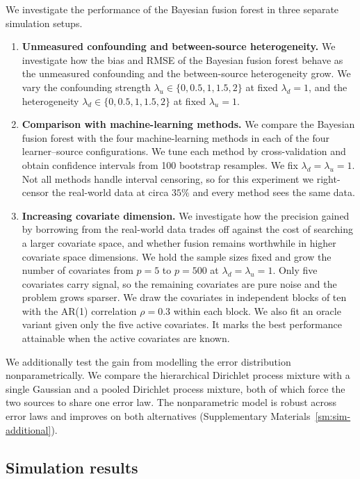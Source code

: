 We investigate the performance of the Bayesian fusion forest in three separate simulation setups.
\begin{enumerate}[label=\arabic*), leftmargin=*]
  \item \textbf{Unmeasured confounding and between-source heterogeneity.}
    We investigate how the bias and RMSE of the Bayesian fusion forest behave as the unmeasured confounding and the between-source heterogeneity grow.
    We vary the confounding strength $\lambda_u \in \{0, 0.5, 1, 1.5, 2\}$ at fixed $\lambda_d = 1$, and the heterogeneity $\lambda_d \in \{0, 0.5, 1, 1.5, 2\}$ at fixed $\lambda_u = 1$.
  \item \textbf{Comparison with machine-learning methods.}
    We compare the Bayesian fusion forest with the four machine-learning methods in each of the four learner--source configurations.
    We tune each method by cross-validation and obtain confidence intervals from 100 bootstrap resamples.
    We fix $\lambda_d = \lambda_u = 1$.
    Not all methods handle interval censoring, so for this experiment we right-censor the real-world data at circa $35\%$ and every method sees the same data.
  \item \textbf{Increasing covariate dimension.}
    We investigate how the precision gained by borrowing from the real-world data trades off against the cost of searching a larger covariate space, and whether fusion remains worthwhile in higher covariate space dimensions.
    We hold the sample sizes fixed and grow the number of covariates from $p = 5$ to $p = 500$ at $\lambda_d = \lambda_u = 1$.
    Only five covariates carry signal, so the remaining covariates are pure noise and the problem grows sparser.
    We draw the covariates in independent blocks of ten with the AR(1) correlation $\rho = 0.3$ within each block.
    We also fit an oracle variant given only the five active covariates.
    It marks the best performance attainable when the active covariates are known.
\end{enumerate}

We additionally test the gain from modelling the error distribution nonparametrically.
We compare the hierarchical Dirichlet process mixture with a single Gaussian and a pooled Dirichlet process mixture, both of which force the two sources to share one error law.
The nonparametric model is robust across error laws and improves on both alternatives (Supplementary Materials~\ref{sm:sim-additional}).

\subsection{Simulation results}

